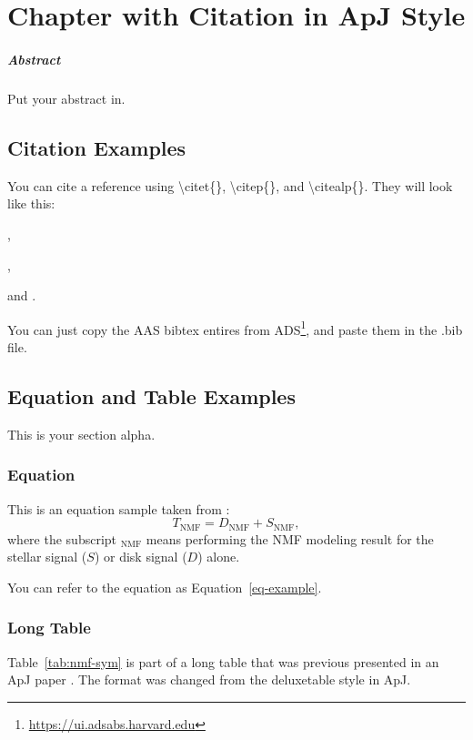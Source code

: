 \chapter{Chapter with Citation in ApJ Style}\label{chapter-apj}
\paragraph*{Abstract} Put your abstract in.
\section{Citation Examples}
You can cite a reference using \textbackslash{citet\{\}}, \textbackslash{citep\{\}}, and \textbackslash{citealp\{\}}. They will look like this:

\citet{ren18}, 

\citep{ren18},

and \citealp{ren18}.

You can just copy the AAS bibtex entires from ADS\footnote{\url{https://ui.adsabs.harvard.edu}}, and paste them in the .bib file.

\section{Equation and Table Examples}\label{sec:alpha}
This is your section alpha. 
\subsection{Equation}\label{eq-sample}
This is an equation sample taken from \citet{ren18}:
\begin{equation}
T_{\text{NMF}} = D_{\text{NMF}} + S_{\text{NMF}},\label{eq-example}
\end{equation}
where the subscript ${}_{\text{NMF}}$ means performing the NMF modeling result for the stellar signal ($S$) or disk signal ($D$) alone.

You can refer to the equation as Equation~\eqref{eq-example}.

\subsection{Long Table}\label{appendixSymbols}
Table~\ref{tab:nmf-sym} is part of a long table that was previous presented in an ApJ paper \citep{ren18}. The format was changed from the deluxetable style in ApJ.

